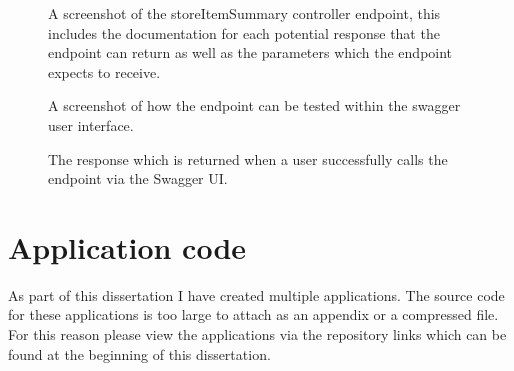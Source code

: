 \documentclass[a4paper,11pt]{report}
\begin{document}
\begin{appendix}
\begin{figure}[H]
        \caption{A screenshot of the storeItemSummary controller endpoint, this includes the documentation for each potential response that the endpoint can return as well as the parameters which the endpoint expects to receive.}
        \label{fig:endpointExample}
    \end{figure}
    \begin{figure}[H]
        \centering
        \caption{A screenshot of how the endpoint can be tested within the swagger user interface.}
        \label{fig:endpointTest}
    \end{figure}
    \begin{figure}[H]
        \centering
        \caption{The response which is returned when a user successfully calls the endpoint via the Swagger UI.}
        \label{fig:endpointTestResponse}
    \end{figure}
    \chapter{Application code}
    As part of this dissertation I have created multiple applications. The source code for these applications is too large to attach as an appendix or a compressed file. For this reason please view the applications via the repository links which can be found at the beginning of this dissertation.
\end{appendix}
\end{document}
